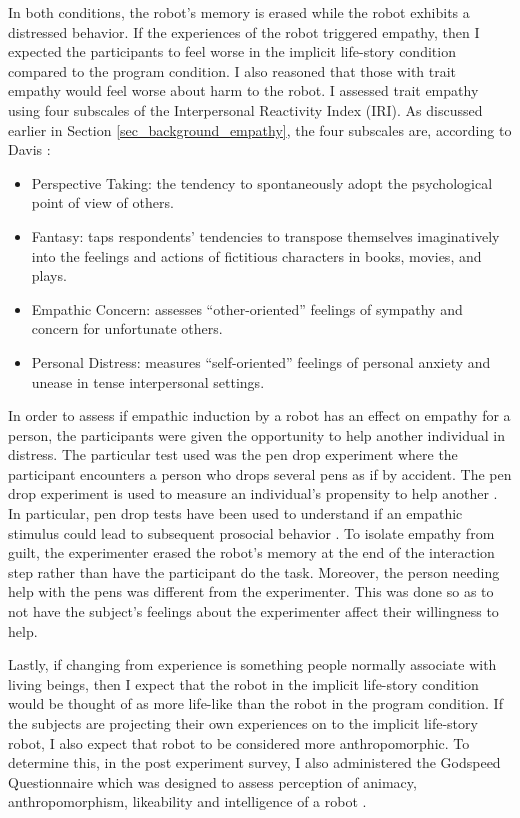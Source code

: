 In both conditions, the robot's memory is erased while the robot exhibits a distressed behavior. If the experiences of the robot triggered empathy, then I expected the participants to feel worse in the implicit life-story condition compared to the program condition. I also reasoned that those with trait empathy would feel worse about harm to the robot. I assessed trait empathy using four subscales of the Interpersonal Reactivity Index (IRI). As discussed earlier in Section \ref{sec_background_empathy}, the four subscales are, according to Davis \cite{davis_multidimensional_empathy}:

\begin{itemize}
\item Perspective Taking: the tendency to spontaneously adopt the psychological point of view of others.
\item Fantasy: taps respondents' tendencies to transpose themselves imaginatively into
the feelings and actions of fictitious characters in books, movies, and plays.
\item Empathic Concern: assesses ``other-oriented'' feelings of sympathy and concern for unfortunate others.
\item Personal Distress: measures ``self-oriented'' feelings of personal anxiety and unease in tense interpersonal settings.
\end{itemize}

In order to assess if empathic induction by a robot has an effect on empathy for a person, the participants were given the opportunity to help another individual in distress. The particular test used was the pen drop experiment where the participant encounters a person who drops several pens as if by accident. The pen drop experiment is used to measure an individual's propensity to help another \cite{macrae_pen_drop}. In particular, pen drop tests have been used to understand if an empathic stimulus could lead to subsequent prosocial behavior \cite{greitemeyer_videogame_prosocial}. To isolate empathy from guilt, the experimenter erased the robot's memory at the end of the interaction step rather than have the participant do the task. Moreover, the person needing help with the pens was different from the experimenter. This was done so as to not have the subject's feelings about the experimenter affect their willingness to help. 

Lastly, if changing from experience is something people normally associate with living beings, then I expect that the robot in the implicit life-story condition would be thought of as more life-like than the robot in the program condition. If the subjects are projecting their own experiences on to the implicit life-story robot, I also expect that robot to be considered more anthropomorphic. To determine this, in the post experiment survey, I also administered the Godspeed Questionnaire which was designed to assess perception of animacy, anthropomorphism, likeability and intelligence of a robot \cite{bartneck_godspeed}.  


